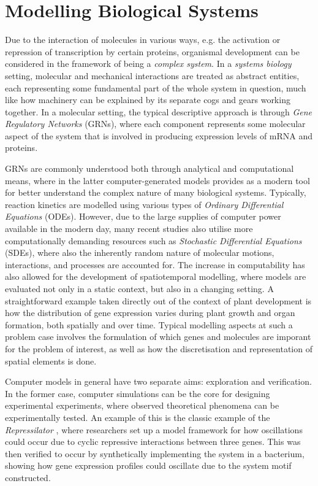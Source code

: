 
\section{Modelling Biological Systems} %
Due to the interaction of molecules in various ways, e.g. the activation or
repression of transcription by certain proteins, organismal development can be
considered in the framework of being a \textit{complex system}. In a
\textit{systems biology} setting, molecular and mechanical interactions are
treated as abstract entities, each representing some fundamental part of the
whole system in question, much like how machinery can be explained by its
separate cogs and gears working together. In a molecular setting, the typical
descriptive approach is through \textit{Gene Regulatory Networks} (GRNs), where
each component represents some molecular aspect of the system that is involved in
producing expression levels of mRNA and proteins. \CITE

GRNs are commonly understood both through analytical and computational means,
where in the latter computer-generated models provides as a modern tool for
better understand the complex nature of many biological systems. Typically,
reaction kinetics are modelled using various types of \textit{Ordinary
  Differential Equations} (ODEs). However, due to the large supplies of computer
power available in the modern day, many recent studies also utilise more
computationally demanding resources such as \textit{Stochastic Differential
  Equations} (SDEs), where also the inherently random nature of molecular
motions, interactions, and processes are accounted for. The increase in
computability has also allowed for the development of spatiotemporal modelling,
where models are evaluated not only in a static context, but also in a changing
setting. A straightforward example taken directly out of the context of plant
development is how the distribution of gene expression varies during plant
growth and organ formation, both spatially and over time. Typical modelling
aspects at such a problem case involves the formulation of which genes and
molecules are imporant for the problem of interest, as well as how the
discretisation and representation of spatial elements is done. \CITE

Computer models in general have two separate aims: exploration and verification.
In the former case, computer simulations can be the core for designing
experimental experiments, where observed theoretical phenomena can be
experimentally tested. An example of this is the classic example of the
\textit{Repressilator} \CITE, where researchers set up a model framework for how
oscillations could occur due to cyclic repressive interactions between three
genes. This was then verified to occur by synthetically implementing the system
in a bacterium, showing how gene expression profiles could oscillate due to the
system motif constructed. 

